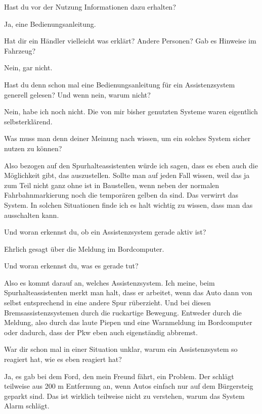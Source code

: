 \interviewerin
Hast du vor der Nutzung Informationen dazu erhalten?

Ja, eine Bedienungsanleitung.

\interviewerin
Hat dir ein Händler vielleicht was erklärt? Andere Personen? Gab es
Hinweise im Fahrzeug?

Nein, gar nicht.

\interviewerin
Hast du denn schon mal eine Bedienungsanleitung für ein Assistenzsystem
generell gelesen? Und wenn nein, warum nicht?

Nein, habe ich noch nicht. Die von mir bisher genutzten Systeme waren
eigentlich selbsterklärend.

\interviewerin
Was muss man denn deiner Meinung nach wissen, um ein solches System
sicher nutzen zu können?

Also bezogen auf den Spurhalteassistenten würde ich sagen, dass es eben
auch die Möglichkeit gibt, das auszustellen. Sollte man auf jeden Fall
wissen, weil das ja zum Teil nicht ganz ohne ist in Baustellen, wenn
neben der normalen Fahrbahnmarkierung noch die temporären gelben da
sind. Das verwirrt das System. In solchen Situationen finde ich es halt
wichtig zu wissen, dass man das ausschalten kann.

\interviewerin
Und woran erkennst du, ob ein Assistenzsystem gerade aktiv ist?

Ehrlich gesagt über die Meldung im Bordcomputer.

\interviewerin
Und woran erkennst du, was es gerade tut?

Also es kommt darauf an, welches Assistenzsystem. Ich meine, beim
Spurhalteassistenten merkt man halt, dass er arbeitet, wenn das Auto
dann von selbst entsprechend in eine andere Spur rüberzieht. Und bei
diesen Bremsassistenzsystemen durch die ruckartige Bewegung. Entweder
durch die Meldung, also durch das laute Piepen und eine Warnmeldung im
Bordcomputer oder dadurch, dass der Pkw eben auch eigenständig abbremst.

\interviewerin
War dir schon mal in einer Situation unklar, warum ein Assistenzsystem
so reagiert hat, wie es eben reagiert hat?

Ja, es gab bei dem Ford, den mein Freund fährt, ein Problem. Der schlägt
teilweise aus 200 m Entfernung an, wenn Autos einfach nur auf dem
Bürgersteig geparkt sind. Das ist wirklich teilweise nicht zu
verstehen, warum das System Alarm schlägt.

